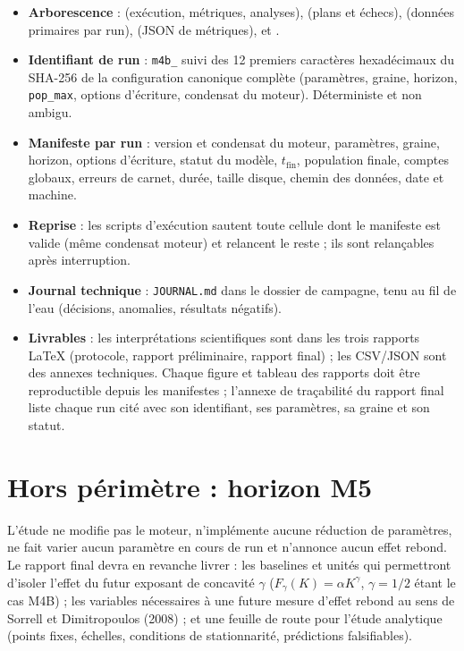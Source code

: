 \documentclass[11pt,a4paper]{article}
\newcommand{\code}[1]{\texttt{#1}}
\begin{document}
\begin{itemize}
\item \textbf{Arborescence} :  (exécution, métriques,
  analyses),  (plans et échecs), 
  (données primaires par run),  (JSON de
  métriques),  et .
\item \textbf{Identifiant de run} : \code{m4b\_} suivi des 12 premiers
  caractères hexadécimaux du SHA-256 de la configuration canonique
  complète (paramètres, graine, horizon, \code{pop\_max}, options
  d'écriture, condensat du moteur). Déterministe et non ambigu.
\item \textbf{Manifeste par run} : version et condensat du moteur,
  paramètres, graine, horizon, options d'écriture, statut du modèle,
  $t_{\mathrm{fin}}$, population finale, comptes globaux, erreurs de
  carnet, durée, taille disque, chemin des données, date et machine.
\item \textbf{Reprise} : les scripts d'exécution sautent toute cellule
  dont le manifeste est valide (même condensat moteur) et relancent le
  reste ; ils sont relançables après interruption.
\item \textbf{Journal technique} : \code{JOURNAL.md} dans le dossier de
  campagne, tenu au fil de l'eau (décisions, anomalies, résultats
  négatifs).
\item \textbf{Livrables} : les interprétations scientifiques sont dans
  les trois rapports LaTeX (protocole, rapport préliminaire, rapport
  final) ; les CSV/JSON sont des annexes techniques. Chaque
  figure et tableau des rapports doit être reproductible depuis les
  manifestes ; l'annexe de traçabilité du rapport final liste chaque run
  cité avec son identifiant, ses paramètres, sa graine et son statut.
\end{itemize}

\section*{Hors périmètre : horizon M5}

L'étude ne modifie pas le moteur, n'implémente aucune réduction de
paramètres, ne fait varier aucun paramètre en cours de run et n'annonce
aucun effet rebond. Le rapport final devra en revanche livrer : les
baselines et unités qui permettront d'isoler l'effet du futur exposant de
concavité $\gamma$ ($F_\gamma(K)=\alpha K^\gamma$, $\gamma=1/2$ étant le
cas M4B) ; les variables nécessaires à une future mesure d'effet rebond au
sens de Sorrell et Dimitropoulos (2008) ; et une feuille de route pour
l'étude analytique (points fixes, échelles, conditions de stationnarité,
prédictions falsifiables).
\end{document}
